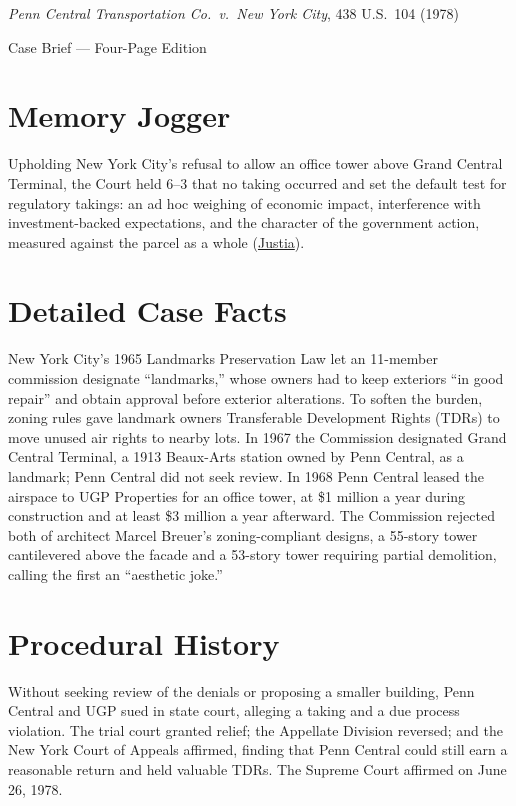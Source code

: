 \documentclass[12pt]{article}
\begin{document}
\begin{center}
{\LARGE \textit{Penn Central Transportation Co.\ v.\ New York City}, 438 U.S.\ 104 (1978)\par}
\vspace{0.8em}
{\large Case Brief --- Four-Page Edition\par}
\end{center}
\vspace{1em}

\section{Memory Jogger}

Upholding New York City's refusal to allow an office tower above Grand Central Terminal, the Court held 6--3 that no taking occurred and set the default test for regulatory takings: an ad hoc weighing of economic impact, interference with investment-backed expectations, and the character of the government action, measured against the parcel as a whole (\href{https://supreme.justia.com/cases/federal/us/438/104/}{Justia}).

\section{Detailed Case Facts}

New York City's 1965 Landmarks Preservation Law let an 11-member commission designate ``landmarks,'' whose owners had to keep exteriors ``in good repair'' and obtain approval before exterior alterations. To soften the burden, zoning rules gave landmark owners Transferable Development Rights (TDRs) to move unused air rights to nearby lots. In 1967 the Commission designated Grand Central Terminal, a 1913 Beaux-Arts station owned by Penn Central, as a landmark; Penn Central did not seek review. In 1968 Penn Central leased the airspace to UGP Properties for an office tower, at \$1 million a year during construction and at least \$3 million a year afterward. The Commission rejected both of architect Marcel Breuer's zoning-compliant designs, a 55-story tower cantilevered above the facade and a 53-story tower requiring partial demolition, calling the first an ``aesthetic joke.''

\section{Procedural History}

Without seeking review of the denials or proposing a smaller building, Penn Central and UGP sued in state court, alleging a taking and a due process violation. The trial court granted relief; the Appellate Division reversed; and the New York Court of Appeals affirmed, finding that Penn Central could still earn a reasonable return and held valuable TDRs. The Supreme Court affirmed on June 26, 1978.
\end{document}
